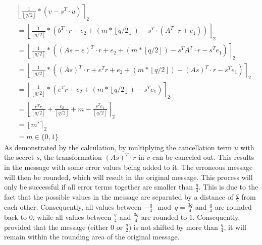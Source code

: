 \begin{align*}
   & \left\lfloor \frac{1}{\left\lfloor q/2\right\rfloor}*(v-s^T \cdot u)\right\rceil _2                                                                                     \\
   & = \left\lfloor \frac{1}{\left\lfloor q/2\right\rfloor}*(b^T \cdot r + e_2 + (m*\left\lfloor q/2\right\rfloor)-s^T \cdot (A^T \cdot r + e_1))\right\rceil _2             \\
   & = \left\lfloor \frac{1}{\left\lfloor q/2\right\rfloor}*((As+e)^T \cdot r + e_2 + (m*\left\lfloor q/2\right\rfloor)-s^T A^T \cdot r - s^T e_1)\right\rceil _2            \\
   & = \left\lfloor \frac{1}{\left\lfloor q/2\right\rfloor}*((As)^T \cdot r + e^Tr+ e_2 + (m*\left\lfloor q/2\right\rfloor)-(As)^T \cdot r - s^T e_1)\right\rceil _2         \\
   & = \left\lfloor \frac{1}{\left\lfloor q/2\right\rfloor}*(e^Tr+ e_2 + (m*\left\lfloor q/2\right\rfloor)- s^T e_1)\right\rceil _2                                          \\
   & = \left\lfloor \frac{e^Tr}{\left\lfloor q/2\right\rfloor}+ \frac{e_2 }{\left\lfloor q/2\right\rfloor}+ m - \frac{s^T e_1}{\left\lfloor q/2\right\rfloor}\right\rceil _2 \\
   & = \left\lfloor m' \right\rceil _2                                                                                                                                       \\
   & = m \in \{0,1\}
\end{align*}
As demonstrated by the calculation, by multiplying the cancellation term $u$ with the secret $s$, the transformation $(As)^T \cdot r$ in $v$ can be canceled out. This results in the message with some error values being added to it. The erroneous message will then be rounded, which will result in the original message. This process will only be successful if all error terms together are smaller than $\frac{q}{4}$. This is due to the fact that the possible values in the message are separated by a distance of $\frac{q}{2}$ from each other. Consequently, all values between $-\frac{q}{4}\mod q=\frac{3q}{4}$ and $\frac{q}{4}$ are rounded back to $0$, while all values between $\frac{q}{4}$ and $\frac{3q}{4}$ are rounded to $1$. Consequently, provided that the message (either $0$ or $\frac{q}{2}$) is not shifted by more than $\frac{q}{4}$, it will remain within the rounding area of the original message.


